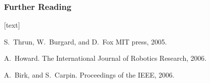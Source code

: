 \frametitle<presentation>{Further Reading}    

  \begin{thebibliography}{10}    
  [text]



    S.~Thrun, W.~Burgard, and D.~Fox
    \newblock MIT press, 2005.    


	A.~Howard.
    \newblock The International Journal of Robotics Research, 2006.  

    
	A.~Birk, and S.~Carpin.
    \newblock Proceedings of the IEEE, 2006.  

       
    
    
  \end{thebibliography}